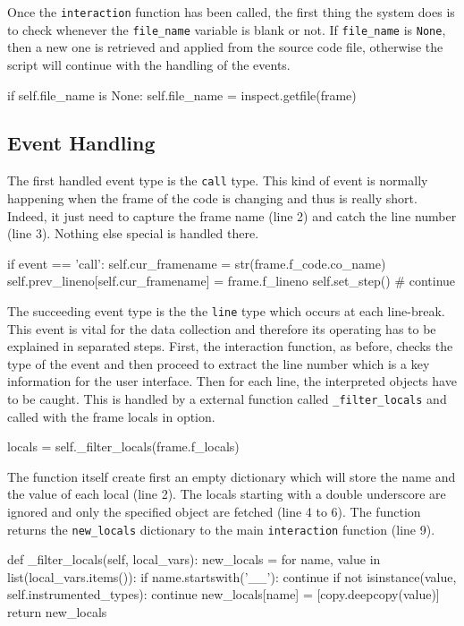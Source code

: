 Once the \texttt{interaction} function has been called, the first thing the system does is to check whenever the \texttt{file\_name} variable is blank or not. If \texttt{file\_name} is \texttt{None}, then a new one is retrieved and applied from the source code file, otherwise the script will continue with the handling of the events.
\begin{python}
if self.file_name is None:
    self.file_name = inspect.getfile(frame)
\end{python}

\subsection{Event Handling}
The first handled event type is the \texttt{call} type. This kind of event is normally happening when the frame of the code is changing and thus is really short. Indeed, it just need to capture the frame name (line 2) and catch the line number (line 3). Nothing else special is handled there.
\begin{python}
if event == 'call':
    self.cur_framename = str(frame.f_code.co_name)
    self.prev_lineno[self.cur_framename] = frame.f_lineno
    self.set_step() # continue
\end{python}

The succeeding event type is the the \texttt{line} type which occurs at each line-break. This event is vital for the data collection and therefore its operating has to be explained in separated steps. First, the interaction function, as before, checks the type of the event and then proceed to extract the line number which is a key information for the user interface. Then for each line, the interpreted objects have to be caught. This is handled by a external function called \texttt{\_filter\_locals} and called with the frame locals in option.
\begin{python}
locals = self._filter_locals(frame.f_locals)
\end{python}

The function itself create first an empty dictionary which will store the name and the value of each local (line 2). The locals starting with a double underscore are ignored and only the specified object are fetched (line 4 to 6). The function returns the \texttt{new\_locals} dictionary to the main \texttt{interaction} function (line 9).

\begin{python}
def _filter_locals(self, local_vars):
    new_locals = {}
    for name, value in list(local_vars.items()):
        if name.startswith('__'):
            continue
        if not isinstance(value, self.instrumented_types):
            continue
        new_locals[name] = [copy.deepcopy(value)]
    return new_locals

\end{python}

